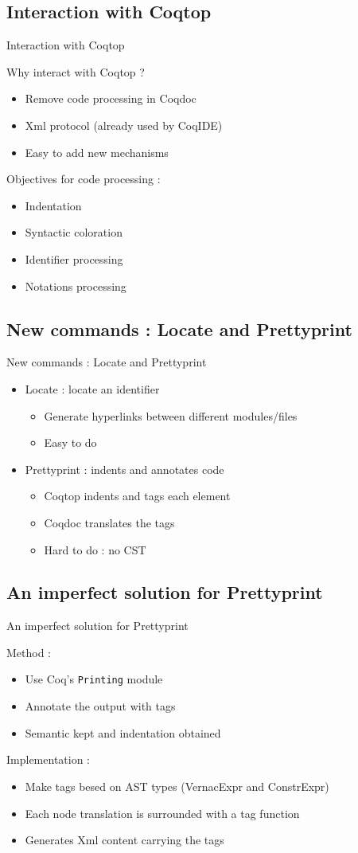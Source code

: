 \documentclass[compress]{beamer}
\newenvironment{tframe}[1]{
  \subsection{#1}
  \begin{frame}{#1}
  }{
  \end{frame}
  }
\begin{document}
  \begin{tframe}{Interaction with Coqtop}
    Why interact with Coqtop ?
    \begin{itemize}[<+->]
      \item Remove code processing in Coqdoc
      \item Xml protocol (already used by CoqIDE)
      \item Easy to add new mechanisms
    \end{itemize}
    \vfill
    Objectives for code processing :
    \begin{itemize}
      \item Indentation
      \item Syntactic coloration
      \item Identifier processing
      \item Notations processing %
    \end{itemize}
  \end{tframe}

  \begin{tframe}{New commands : Locate and Prettyprint}
    \begin{itemize}
      \item Locate : locate an identifier
        \begin{itemize}
          \item Generate hyperlinks between different modules/files
          \item Easy to do
        \end{itemize}
        \vfill
      \item Prettyprint : indents and annotates code
        \begin{itemize}
          \item Coqtop indents and tags each element
          \item Coqdoc translates the tags
          \item Hard to do : no CST
        \end{itemize}
    \end{itemize}
  \end{tframe}

  \begin{tframe}{An imperfect solution for Prettyprint}
    Method :
    \begin{itemize}
      \item Use Coq's \texttt{Printing} module
      \item Annotate the output with tags
      \item Semantic kept and indentation obtained
    \end{itemize}
    Implementation :
    \begin{itemize}
      \item Make tags besed on AST types (VernacExpr and ConstrExpr)
      \item Each node translation is surrounded with a tag function
      \item Generates Xml content carrying the tags
    \end{itemize}
  \end{tframe}
\end{document}
